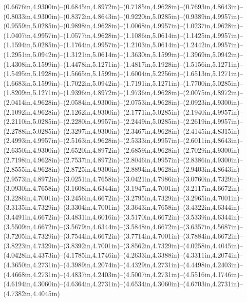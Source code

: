 (0.6676in,4.9300in)--(0.6845in,4.8972in)--(0.7185in,4.9628in)--(0.7693in,4.8643in)--(0.8033in,4.9300in)--(0.8372in,4.8643in)--(0.9220in,5.0285in)--(0.9389in,4.9957in)--(0.9559in,5.0285in)--(0.9898in,4.9628in)--(1.0068in,4.9957in)--(1.0237in,4.9628in)--(1.0407in,4.9957in)--(1.0577in,4.9628in)--(1.1086in,5.0614in)--(1.1425in,4.9957in)--(1.1594in,5.0285in)--(1.1764in,4.9957in)--(1.2103in,5.0614in)--(1.2442in,4.9957in)--(1.2951in,5.0942in)--(1.3121in,5.0614in)--(1.3630in,5.1599in)--(1.3969in,5.0942in)--(1.4308in,5.1599in)--(1.4478in,5.1271in)--(1.4817in,5.1928in)--(1.5156in,5.1271in)--(1.5495in,5.1928in)--(1.5665in,5.1599in)--(1.6004in,5.2256in)--(1.6513in,5.1271in)--(1.6683in,5.1599in)--(1.7022in,5.0942in)--(1.7191in,5.1271in)--(1.7700in,5.0285in)--(1.8209in,5.1271in)--(1.9396in,4.8972in)--(1.9736in,4.9628in)--(2.0075in,4.8972in)--(2.0414in,4.9628in)--(2.0584in,4.9300in)--(2.0753in,4.9628in)--(2.0923in,4.9300in)--(2.1092in,4.9628in)--(2.1262in,4.9300in)--(2.1771in,5.0285in)--(2.1940in,4.9957in)--(2.2110in,5.0285in)--(2.2280in,4.9957in)--(2.2449in,5.0285in)--(2.2619in,4.9957in)--(2.2788in,5.0285in)--(2.3297in,4.9300in)--(2.3467in,4.9628in)--(2.4145in,4.8315in)--(2.4993in,4.9957in)--(2.5163in,4.9628in)--(2.5333in,4.9957in)--(2.6011in,4.8643in)--(2.6350in,4.9300in)--(2.6520in,4.8972in)--(2.6859in,4.9628in)--(2.7029in,4.9300in)--(2.7198in,4.9628in)--(2.7537in,4.8972in)--(2.8046in,4.9957in)--(2.8386in,4.9300in)--(2.8555in,4.9628in)--(2.8725in,4.9300in)--(2.8894in,4.9628in)--(2.9403in,4.8643in)--(2.9573in,4.8972in)--(3.0251in,4.7658in)--(3.0421in,4.7986in)--(3.0760in,4.7329in)--(3.0930in,4.7658in)--(3.1608in,4.6344in)--(3.1947in,4.7001in)--(3.2117in,4.6672in)--(3.2286in,4.7001in)--(3.2456in,4.6672in)--(3.2795in,4.7329in)--(3.2965in,4.7001in)--(3.3135in,4.7329in)--(3.3304in,4.7001in)--(3.3643in,4.7658in)--(3.4322in,4.6344in)--(3.4491in,4.6672in)--(3.4831in,4.6016in)--(3.5170in,4.6672in)--(3.5339in,4.6344in)--(3.5509in,4.6672in)--(3.5679in,4.6344in)--(3.5848in,4.6672in)--(3.6357in,4.5687in)--(3.7205in,4.7329in)--(3.7544in,4.6672in)--(3.7714in,4.7001in)--(3.7884in,4.6672in)--(3.8223in,4.7329in)--(3.8392in,4.7001in)--(3.8562in,4.7329in)--(4.0258in,4.4045in)--(4.0428in,4.4373in)--(4.1785in,4.1746in)--(4.2633in,4.3388in)--(4.3311in,4.2074in)--(4.3650in,4.2731in)--(4.3989in,4.2074in)--(4.4329in,4.2731in)--(4.4498in,4.2403in)--(4.4668in,4.2731in)--(4.4837in,4.2403in)--(4.5007in,4.2731in)--(4.5516in,4.1746in)--(4.6194in,4.3060in)--(4.6364in,4.2731in)--(4.6534in,4.3060in)--(4.6703in,4.2731in)--(4.7382in,4.4045in)
